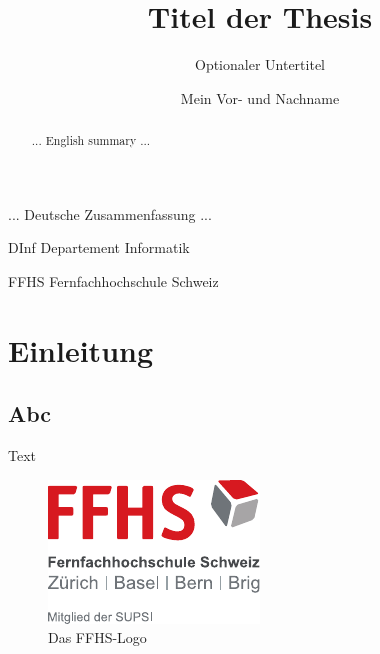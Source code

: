 \documentclass{ffhsthesis}
\begin{document}
\title{Titel der Thesis}
\subtitle{Optionaler Untertitel} %
\author{Mein Vor- und Nachname}

\dedication{Diese Thesis widme ich\\\dots}

\maketitle


\begin{zusammenfassung}
... Deutsche Zusammenfassung ...
\end{zusammenfassung}

\begin{abstract}
... English summary ...
\end{abstract}

\tableofcontents


\begin{abkuerzungen}[MUSTER] %
\item[DInf] Departement Informatik
\item[FFHS] Fernfachhochschule Schweiz
\end{abkuerzungen}


\startThesis %

\chapter{Einleitung}
\section{Abc}

Text

\begin{figure}[ht]
  \begin{center}
  \includegraphics{ffhslogo}
  \end{center}
  \caption{Das FFHS-Logo}
\end{figure}
\end{document}
